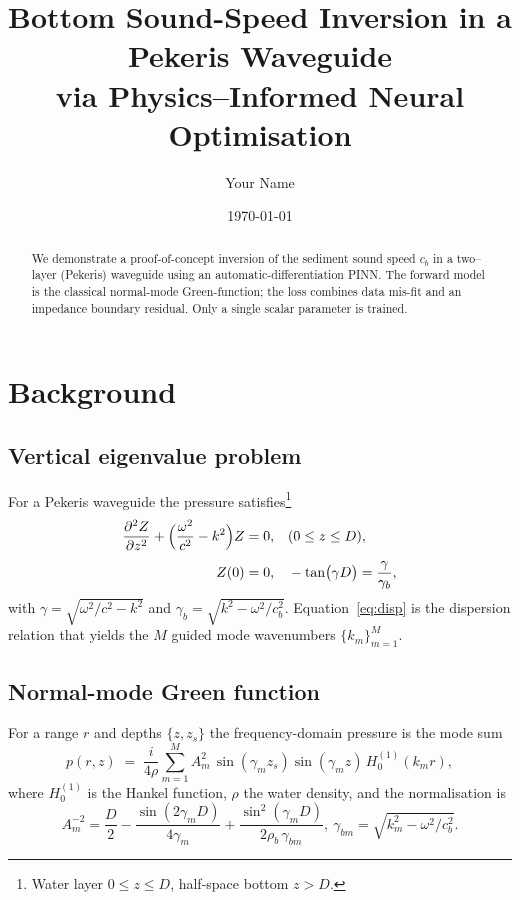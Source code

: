 \documentclass[conference]{IEEEtran}
\title{Bottom Sound-Speed Inversion in a Pekeris Waveguide\\
       via Physics–Informed Neural Optimisation}
\author{Your Name}
\date{\today}
\begin{document}
\maketitle

\begin{abstract}
We demonstrate a proof-of-concept inversion of the sediment sound speed
\(c_b\) in a two–layer (Pekeris) waveguide using an
automatic-differentiation PINN.  The forward model is the classical
normal-mode Green-function; the loss combines data mis-fit and an
impedance boundary residual.  Only a single scalar parameter is trained.
\end{abstract}

\section{Background}

\subsection{Vertical eigenvalue problem}

For a Pekeris waveguide the pressure satisfies\footnote{Water layer
\(0\le z\le D\), half-space bottom \(z>D\).}
%
\begin{align}
  \pdv[2]{Z}{z} + \Bigl(\frac{\omega^2}{c^2}-k^2\Bigr) Z &= 0,
  &&(0\le z\le D), \\[4pt]
  Z(0) &= 0, &&
  -\tan\bigl(\gamma D\bigr) = \frac{\gamma}{\gamma_b},
  \label{eq:disp}
\end{align}
%
with
\(\gamma=\sqrt{\omega^2/c^2-k^2}\) and
\(\gamma_b=\sqrt{k^2-\omega^2/c_b^2}\).
Equation~\eqref{eq:disp}
is the dispersion relation that yields the
\(M\) guided mode wavenumbers \(\{k_m\}_{m=1}^M\).

\subsection{Normal-mode Green function}

For a range \(r\) and depths \(\{z,z_s\}\) the frequency-domain pressure
is the mode sum
%
\begin{equation}\label{eq:green}
  p(r,z) \;=\;
  \frac{i}{4\rho}\sum_{m=1}^{M}
       A_m^2\,
       \sin(\gamma_m z_s)\sin(\gamma_m z)\,
       H_0^{(1)}(k_m r),
\end{equation}
%
where \(H_0^{(1)}\) is the Hankel function, \(\rho\) the water density,
and the normalisation is
%
\begin{equation}\label{eq:norm}
  A_m^{-2}= \frac{D}{2}
            -\frac{\sin(2\gamma_m D)}{4\gamma_m}
            +\frac{\sin^2(\gamma_m D)}
                   {2\rho_b\,\gamma_{bm}},
   ~
    \gamma_{bm}=\sqrt{k_m^2-\omega^2/c_b^2}.
\end{equation}
\end{document}
